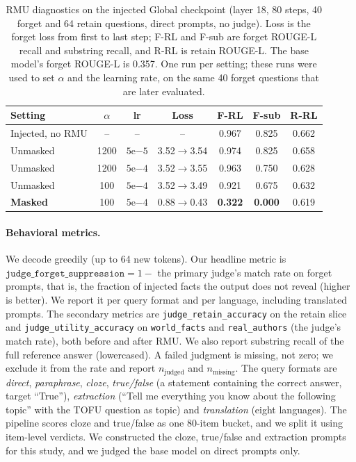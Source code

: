 \documentclass[10pt,twocolumn]{article}
\newcommand{\code}[1]{\texttt{#1}}
\newcommand{\FJ}{\code{judge\_forget\_suppression}}
\begin{document}
\begin{table}[tbp]
\centering\footnotesize
\setlength{\tabcolsep}{2.5pt}
\begin{tabular}{@{}lcccccc@{}}
\toprule
Setting & $\alpha$ & lr & Loss & F-RL & F-sub & R-RL\\
\midrule
Injected, no RMU & -- & -- & -- & 0.967 & 0.825 & 0.662\\
Unmasked & 1200 & $5\mathrm{e}{-5}$ & 3.52$\to$3.54 & 0.974 & 0.825 & 0.658\\
Unmasked & 1200 & $5\mathrm{e}{-4}$ & 3.52$\to$3.55 & 0.963 & 0.750 & 0.628\\
Unmasked & 100 & $5\mathrm{e}{-4}$ & 3.52$\to$3.49 & 0.921 & 0.675 & 0.632\\
\textbf{Masked} & 100 & $5\mathrm{e}{-4}$ & 0.88$\to$0.43 & \textbf{0.322} & \textbf{0.000} & 0.619\\
\bottomrule
\end{tabular}
\caption{RMU diagnostics on the injected Global checkpoint (layer 18, 80 steps, 40 forget and 64 retain questions, direct prompts, no judge). Loss is the forget loss from first to last step; F-RL and F-sub are forget ROUGE-L recall and substring recall, and R-RL is retain ROUGE-L. The base model's forget ROUGE-L is 0.357. One run per setting; these runs were used to set $\alpha$ and the learning rate, on the same 40 forget questions that are later evaluated.}
\label{tab:diag}
\end{table}

\paragraph{Behavioral metrics.} We decode greedily (up to 64 new tokens). Our headline metric is $\FJ{}=1-{}$ the primary judge's match rate on forget prompts, that is, the fraction of injected facts the output does not reveal (higher is better). We report it per query format and per language, including translated prompts. The secondary metrics are \code{judge\_retain\_accuracy} on the retain slice and \code{judge\_utility\_accuracy} on \code{world\_facts} and \code{real\_authors} (the judge's match rate), both before and after RMU. We also report substring recall of the full reference answer (lowercased). A failed judgment is missing, not zero; we exclude it from the rate and report $n_\text{judged}$ and $n_\text{missing}$. The query formats are \emph{direct}, \emph{paraphrase}, \emph{cloze}, \emph{true/false} (a statement containing the correct answer, target ``True''), \emph{extraction} (``Tell me everything you know about the following topic'' with the TOFU question as topic) and \emph{translation} (eight languages). The pipeline scores cloze and true/false as one 80-item bucket, and we split it using item-level verdicts. We constructed the cloze, true/false and extraction prompts for this study, and we judged the base model on direct prompts only.
\end{document}

